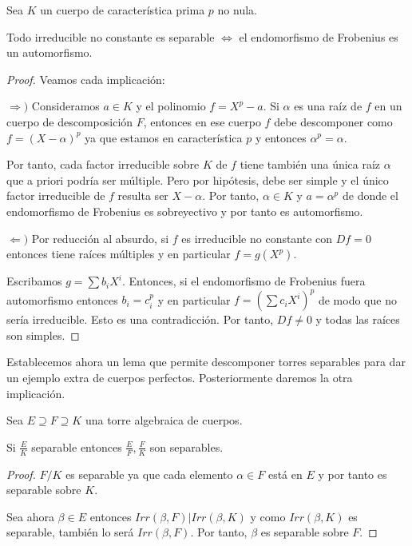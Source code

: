 \begin{theorem}
Sea $K$ un cuerpo de característica prima $p$ no nula. 

Todo irreducible no constante es separable $\iff$ el endomorfismo de Frobenius es un automorfismo. 
\end{theorem}
\begin{proof}
Veamos cada implicación:

$\Rightarrow)$ Consideramos $a \in K$  y el polinomio $f = X^p - a$. Si $\alpha$ es una raíz de $f$ en un cuerpo de descomposición $F$, entonces en ese cuerpo $f$ debe descomponer como $f = (X - \alpha)^p$ ya que estamos en característica $p$ y entonces $\alpha^p = \alpha$. 

Por tanto, cada factor irreducible sobre $K$ de $f$ tiene también una única raíz $\alpha$ que a priori podría ser múltiple. Pero por hipótesis, debe ser simple y el único factor irreducible de $f$ resulta ser $X - \alpha$. Por tanto, $\alpha \in K$ y $a = \alpha^p$ de donde el endomorfismo de Frobenius es sobreyectivo y por tanto es automorfismo. 

$\Leftarrow)$ Por reducción al absurdo, si $f$ es irreducible no constante con $Df = 0$ entonces tiene raíces múltiples y en particular $f = g(X^p)$. 

Escribamos $g = \sum b_iX^i$. Entonces, si el endomorfismo de Frobenius fuera automorfismo entonces $b_i = c_i^p$ y en particular $f = (\sum c_iX^i)^p$ de modo que no sería irreducible. Esto es una contradicción. Por tanto, $Df \neq 0$ y todas las raíces son simples. 
\end{proof}

Establecemos ahora un lema que permite descomponer torres separables para dar un ejemplo extra de cuerpos perfectos. Posteriormente daremos la otra implicación. 

\begin{proposition}
Sea $E \supseteq F \supseteq K$ una torre algebraica de cuerpos. 

Si $\frac{E}{K}$ separable entonces  $\frac{E}{F},\frac{F}{K}$ son separables. 
\end{proposition}
\begin{proof}
$F/K$ es separable ya que cada elemento $\alpha \in F$ está en $E$ y por tanto es separable sobre $K$. 

Sea ahora $\beta \in E$ entonces $Irr(\beta,F)|Irr(\beta,K)$ y como $Irr(\beta,K)$ es separable, también lo será $Irr(\beta,F)$. Por tanto, $\beta$ es separable sobre $F$. 
\end{proof}


